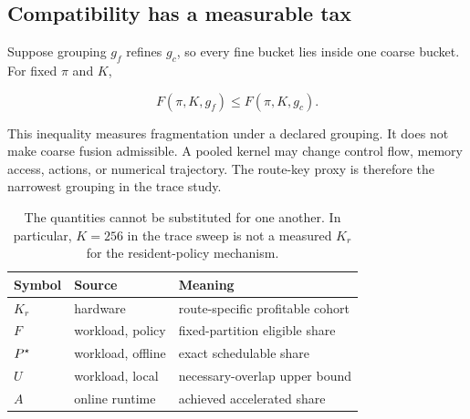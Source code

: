 \subsection{Compatibility has a measurable tax}

Suppose grouping $g_f$ refines $g_c$, so every fine bucket lies inside one
coarse bucket. For fixed $\pi$ and $K$,

\begin{equation}
  F(\pi,K,g_f)\leq F(\pi,K,g_c).
  \label{eq:grouping}
\end{equation}

This inequality measures fragmentation under a declared grouping. It does not
make coarse fusion admissible.
A pooled kernel may change control flow, memory access, actions, or numerical
trajectory. The route-key proxy is therefore the narrowest grouping in the
trace study.

\begin{table}[t]
  \centering
  \footnotesize
  \begin{tabularx}{\columnwidth}{@{}llX@{}}
    \toprule
    Symbol & Source & Meaning \\
    \midrule
    $K_r$ & hardware & route-specific profitable cohort \\
    $F$ & workload, policy & fixed-partition eligible share \\
    $P^\star$ & workload, offline & exact schedulable share \\
    $U$ & workload, local & necessary-overlap upper bound \\
    $A$ & online runtime & achieved accelerated share \\
    \bottomrule
  \end{tabularx}
  \caption{The quantities cannot be substituted for one another. In
  particular, $K=256$ in the trace sweep is not a measured $K_r$ for the
  resident-policy mechanism.}
  \label{tab:notation}
\end{table}
